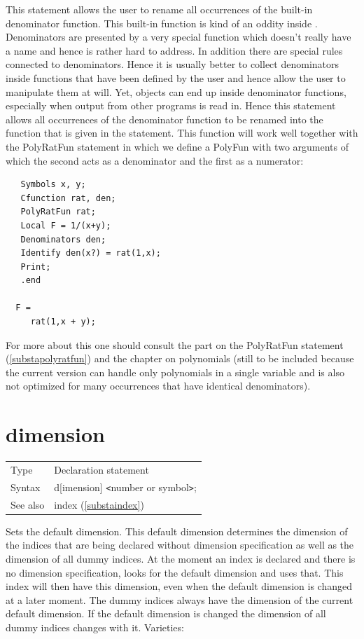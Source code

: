 \noindent This statement allows the user to rename all 
occurrences of the built-in denominator function. This built-in function is 
kind of an oddity inside \FORM\@. Denominators are presented by a very special 
function which doesn't really have a name and hence is rather hard to 
address. In addition there are special rules connected to denominators. 
Hence it is usually better to collect denominators inside functions that 
have been defined by the user and hence allow the user to manipulate them 
at will. Yet, objects can end up inside denominator functions, especially 
when output from other programs is read in. Hence this statement allows all 
occurrences of the denominator function to be renamed into the function 
that is given in the statement. This function will work well together with 
the PolyRatFun statement in which we define a PolyFun with two arguments of 
which the second acts as a denominator and the first as a numerator:
\begin{verbatim}
   Symbols x, y;
   Cfunction rat, den;
   PolyRatFun rat;
   Local F = 1/(x+y); 
   Denominators den;
   Identify den(x?) = rat(1,x);
   Print;
   .end

  F =
     rat(1,x + y);
\end{verbatim}
For more about this one should consult the part on the 
PolyRatFun statement 
(\ref{substapolyratfun}) and the chapter on polynomials (still to be 
included because the current version can handle only polynomials in a 
single variable and is also not optimized for many occurrences that have 
identical denominators).
\vspace{10mm}

 
\section{dimension}
\label{substadimension}

\noindent \begin{tabular}{ll}
Type & Declaration statement\\
Syntax & d[imension] {\tt<}number or symbol{\tt>};
\\ See also & index (\ref{substaindex})
\end{tabular} \vspace{4mm}

\noindent Sets the default dimension. This default 
dimension determines the dimension of the indices that are 
being declared without dimension specification as well as the dimension of 
all dummy indices. At the moment an index is declared 
and there is no dimension specification, {\FORM} looks for the default 
dimension and uses that. This index will then have this dimension, even 
when the default dimension is changed at a later moment. The dummy indices 
always have the dimension of the current default dimension. If the default 
dimension is changed the dimension of all dummy indices changes with it. 
Varieties: \vspace{1mm}


